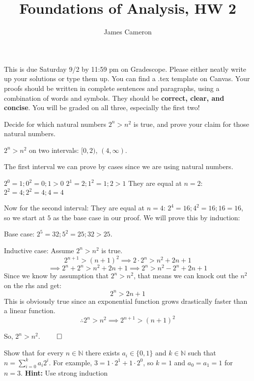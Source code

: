 \documentclass[answers]{exam}
\title{Foundations of Analysis, HW 2}
\author{James Cameron}
\date{}
\theoremstyle{remark}
\theoremstyle{definition}
\newcommand{\NN}{\mathbb{N}}
\begin{document}



 This is due Saturday 9/2 by 11:59 pm on Gradescope. Please either neatly write up your solutions or type them up. You can find a .tex template on Canvas. Your proofs should be written in complete sentences and paragraphs, using a combination of words and symbols. They should be \textbf{correct, clear, and concise}. You will be graded on all three, especially the first two!

\noindent


\begin{questions}





\question  Decide for which natural numbers $2^n > n^2$ is true, and prove your claim for those natural numbers.

\begin{solution}

$2^n > n^2$ on two intervals: $[0, 2)$, $(4, \infty)$.

The first interval we can prove by cases since we are using natural numbers.

$2^0 = 1; 0^2 = 0; 1 > 0$
$2^1 = 2; 1^2 = 1; 2 > 1$
They are equal at $n = 2$:
$2^2 = 4; 2^2 = 4; 4 = 4$

Now for the second interval:
They are equal at $n = 4$:
$2^4 = 16; 4^2 = 16; 16 = 16$,
so we start at $5$ as the base case in our proof.
We will prove this by induction:

Base case:
$2^5 = 32; 5^2 = 25; 32 > 25$.

Inductive case:
Assume $2^n > n^2$ is true.
\[2^{n+1} > (n+1)^2
\implies 2 \cdot 2^n > n^2 + 2n + 1\]
\[\implies 2^n + 2^n > n^2 + 2n + 1
\implies 2^n > n^2 - 2^n + 2n + 1\]
Since we know by assumption that $2^n > n^2$,
that means we can knock out the $n^2$ on the rhs and get:
\[2^n > 2n + 1\]
This is obviously true since an exponential function grows drastically faster than a linear function.
\[\therefore 2^n > n^2 \implies 2^{n+1} > (n+1)^2\]

So, $2^n > n^2$. $\qed$

\end{solution}

\question Show that for every $n \in \NN$ there exists $a_i \in \{0,1\}$ and $k \in \NN$ such that $n= \sum_{i=0}^k a_i 2^i$. For example, $3=1\cdot 2^1+ 1 \cdot 2^0$, so $k=1$ and $a_0=a_1=1$ for $n=3$. \textbf{Hint:} Use strong induction


\end{questions}
\end{document}

